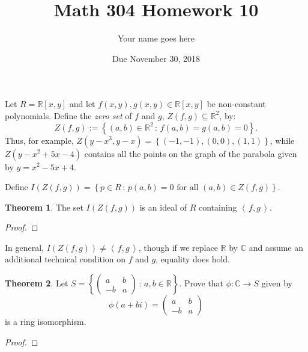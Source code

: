 \documentclass[11pt]{article}		%
\title{Math 304 Homework 10}
\author{Your name goes here}
\date{Due November 30, 2018}
\def\C{{\mathbb C}}
\def\R{{\mathbb R}}
\theoremstyle{definition}
\newtheorem{theorem}{Theorem}
\newcommand{\ideal}[1]{\left\langle\, #1 \,\right\rangle}
\def\set#1{\left\{ {#1} \right\}}
\def\setof#1#2{{\left\{#1\,\colon\,#2\right\}}}
\begin{document}
\maketitle


Let $R = \R[x,y]$ and let $f(x,y), g(x,y)\in \R[x,y]$ be non-constant polynomials.
Define the \emph{zero set} of $f$ and $g$, $Z(f,g)\subseteq \R^2$, by:
\[
	Z(f,g) := \setof{(a,b)\in \R^2}{f(a,b) = g(a,b) = 0}.
\]
Thus, for example, $Z(y-x^3, y - x) = \set{(-1,-1),(0,0),(1,1)}$, while $Z(y-x^2+5x-4)$ contains all the points on the graph of the parabola given by $y = x^2 -5x + 4$.

Define $I(Z(f,g)) = \setof{p\in R}{p(a,b) = 0 \text{ for all } (a,b)\in Z(f,g)}$.


\begin{theorem}
	The set $I(Z(f,g))$ is an ideal of $R$ containing $\ideal{f,g}$.
\end{theorem}

\begin{proof}

\end{proof}

In general, $I(Z(f,g)) \ne \ideal{f,g}$, though if we replace $\R$ by $\C$ and assume an additional technical condition on $f$ and $g$, equality does hold.




\begin{theorem}
	Let $S = \setof{\left(\begin{matrix} a & b \\ -b & a \end{matrix}\right)}{a,b\in \R}$.
	Prove that $\phi : \C \to S$ given by
	\[
		\phi(a+bi) = \left(\begin{matrix} a & b \\ -b & a \end{matrix}\right)
	\]
	is a ring isomorphism.	
\end{theorem}


\begin{proof}

\end{proof} 
 
\end{document}
